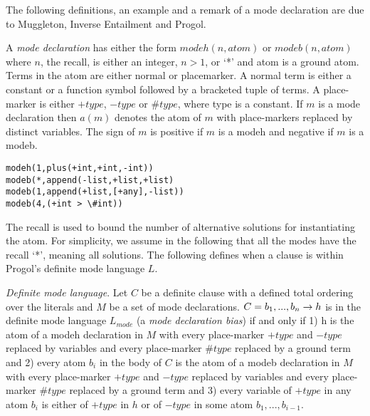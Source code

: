 The following definitions, an example and a remark of a mode declaration are due to Muggleton, Inverse Entailment and Progol\cite{muggleton1995inverse}.
\begin{defn}\cite{muggleton1995inverse}
A \emph{mode declaration} has either the form
$modeh(n,atom)$ or $modeb(n,atom)$ where $n$, the recall, is either an integer, $n > 1$,
or `*' and atom is a ground atom. Terms in the atom are either normal or placemarker. A normal term is either a constant or a function symbol followed by a
bracketed tuple of terms. A place-marker is either $+type$, $-type$ or $\#type$, where
type is a constant. If $m$ is a mode declaration then $a(m)$ denotes the atom of $m$
with place-markers replaced by distinct variables. The sign of $m$ is positive if $m$ is a modeh and negative if $m$ is a modeb.
\end{defn}

\begin{exmp}
\cite{muggleton1995inverse}
\begin{lstlisting}
modeh(1,plus(+int,+int,-int))
modeb(*,append(-list,+list,+list)
modeb(1,append(+list,[+any],-list))
modeb(4,(+int > \#int))
\end{lstlisting}
\end{exmp}

\begin{remark}
\cite{muggleton1995inverse}
The recall is used to bound the number of alternative solutions for instantiating
the atom. For simplicity, we assume in the following that all the modes have the
recall `*', meaning all solutions. The following defines when a clause is within
Progol's definite mode language $L$.
\end{remark}

\begin{defn}
\cite{muggleton1995inverse}
\emph{Definite mode language}. Let $C$ be a definite clause with a
defined total ordering over the literals and $M$ be a set of mode declarations. $C = b_1, ..., b_n \to h$ is in the definite mode language $L_{mode}$ (a \emph{mode declaration bias}) if and only if
1) h is the atom
of a modeh declaration in $M$ with every place-marker $+type$ and $-type$ replaced by
variables and every place-marker $\#type$ replaced by a ground term and 2) every
atom $b_i$ in the body of $C$ is the atom of a modeb declaration in $M$ with every
place-marker $+type$ and $-type$ replaced by variables and every place-marker $\#type$
replaced by a ground term and 3) every variable of $+type$ in any atom $b_i$ is either
of $+type$ in $h$ or of $-type$ in some atom $b_1, ..., b_{i-1}$.
\end{defn}

